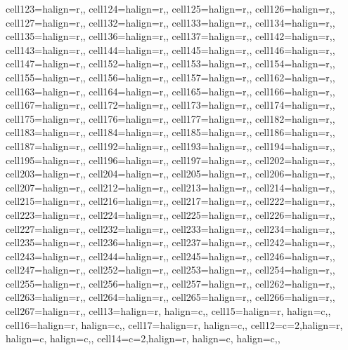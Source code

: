 \begin{table}
\begin{talltblr}[         %
caption={Summary Statistics by Group},
]
{cell{12}{3}={}{halign=r,},
cell{12}{4}={}{halign=r,},
cell{12}{5}={}{halign=r,},
cell{12}{6}={}{halign=r,},
cell{12}{7}={}{halign=r,},
cell{13}{2}={}{halign=r,},
cell{13}{3}={}{halign=r,},
cell{13}{4}={}{halign=r,},
cell{13}{5}={}{halign=r,},
cell{13}{6}={}{halign=r,},
cell{13}{7}={}{halign=r,},
cell{14}{2}={}{halign=r,},
cell{14}{3}={}{halign=r,},
cell{14}{4}={}{halign=r,},
cell{14}{5}={}{halign=r,},
cell{14}{6}={}{halign=r,},
cell{14}{7}={}{halign=r,},
cell{15}{2}={}{halign=r,},
cell{15}{3}={}{halign=r,},
cell{15}{4}={}{halign=r,},
cell{15}{5}={}{halign=r,},
cell{15}{6}={}{halign=r,},
cell{15}{7}={}{halign=r,},
cell{16}{2}={}{halign=r,},
cell{16}{3}={}{halign=r,},
cell{16}{4}={}{halign=r,},
cell{16}{5}={}{halign=r,},
cell{16}{6}={}{halign=r,},
cell{16}{7}={}{halign=r,},
cell{17}{2}={}{halign=r,},
cell{17}{3}={}{halign=r,},
cell{17}{4}={}{halign=r,},
cell{17}{5}={}{halign=r,},
cell{17}{6}={}{halign=r,},
cell{17}{7}={}{halign=r,},
cell{18}{2}={}{halign=r,},
cell{18}{3}={}{halign=r,},
cell{18}{4}={}{halign=r,},
cell{18}{5}={}{halign=r,},
cell{18}{6}={}{halign=r,},
cell{18}{7}={}{halign=r,},
cell{19}{2}={}{halign=r,},
cell{19}{3}={}{halign=r,},
cell{19}{4}={}{halign=r,},
cell{19}{5}={}{halign=r,},
cell{19}{6}={}{halign=r,},
cell{19}{7}={}{halign=r,},
cell{20}{2}={}{halign=r,},
cell{20}{3}={}{halign=r,},
cell{20}{4}={}{halign=r,},
cell{20}{5}={}{halign=r,},
cell{20}{6}={}{halign=r,},
cell{20}{7}={}{halign=r,},
cell{21}{2}={}{halign=r,},
cell{21}{3}={}{halign=r,},
cell{21}{4}={}{halign=r,},
cell{21}{5}={}{halign=r,},
cell{21}{6}={}{halign=r,},
cell{21}{7}={}{halign=r,},
cell{22}{2}={}{halign=r,},
cell{22}{3}={}{halign=r,},
cell{22}{4}={}{halign=r,},
cell{22}{5}={}{halign=r,},
cell{22}{6}={}{halign=r,},
cell{22}{7}={}{halign=r,},
cell{23}{2}={}{halign=r,},
cell{23}{3}={}{halign=r,},
cell{23}{4}={}{halign=r,},
cell{23}{5}={}{halign=r,},
cell{23}{6}={}{halign=r,},
cell{23}{7}={}{halign=r,},
cell{24}{2}={}{halign=r,},
cell{24}{3}={}{halign=r,},
cell{24}{4}={}{halign=r,},
cell{24}{5}={}{halign=r,},
cell{24}{6}={}{halign=r,},
cell{24}{7}={}{halign=r,},
cell{25}{2}={}{halign=r,},
cell{25}{3}={}{halign=r,},
cell{25}{4}={}{halign=r,},
cell{25}{5}={}{halign=r,},
cell{25}{6}={}{halign=r,},
cell{25}{7}={}{halign=r,},
cell{26}{2}={}{halign=r,},
cell{26}{3}={}{halign=r,},
cell{26}{4}={}{halign=r,},
cell{26}{5}={}{halign=r,},
cell{26}{6}={}{halign=r,},
cell{26}{7}={}{halign=r,},
cell{1}{3}={}{halign=r, halign=c,},
cell{1}{5}={}{halign=r, halign=c,},
cell{1}{6}={}{halign=r, halign=c,},
cell{1}{7}={}{halign=r, halign=c,},
cell{1}{2}={c=2,}{halign=r, halign=c, halign=c,},
cell{1}{4}={c=2,}{halign=r, halign=c, halign=c,},
}
\end{talltblr}
\end{table}
